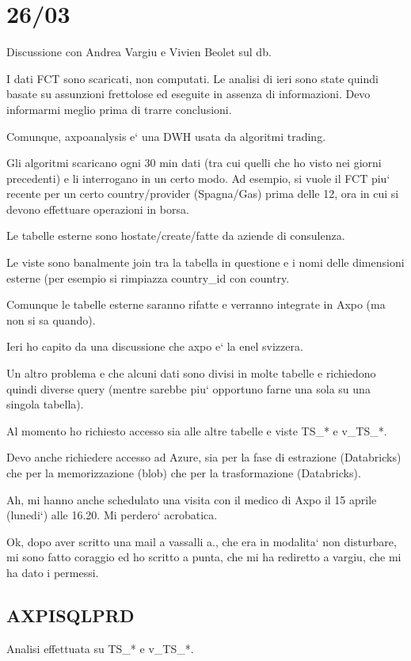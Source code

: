 \section{26/03}
    Discussione con Andrea Vargiu e Vivien Beolet sul db.
    
    I dati FCT sono scaricati, non computati. Le analisi di ieri sono state quindi basate su assunzioni frettolose ed eseguite in assenza di informazioni.
    Devo informarmi meglio prima di trarre conclusioni.
    
    Comunque, axpoanalysis e` una DWH usata da algoritmi trading.
    
    Gli algoritmi scaricano ogni 30 min dati (tra cui quelli che ho visto nei giorni precedenti) e li interrogano in un certo modo.
    Ad esempio, si vuole il FCT piu` recente per un certo country/provider (Spagna/Gas) prima delle 12, ora in cui si devono effettuare operazioni in borsa.
    
    Le tabelle esterne sono hostate/create/fatte da aziende di consulenza.
    
    Le viste sono banalmente join tra la tabella in questione e i nomi delle dimensioni esterne (per esempio si rimpiazza country\_id con country.
    
    Comunque le tabelle esterne saranno rifatte e verranno integrate in Axpo (ma non si sa quando).
    
    Ieri ho capito da una discussione che axpo e` la enel svizzera.
    
    Un altro problema e che alcuni dati sono divisi in molte tabelle e richiedono quindi diverse query (mentre sarebbe piu` opportuno farne una sola su una singola tabella).
    
    Al momento ho richiesto accesso sia alle altre tabelle e viste TS\_* e v\_TS\_*.
    
    Devo anche richiedere accesso ad Azure, sia per la fase di estrazione (Databricks) che per la memorizzazione (blob) che per la trasformazione (Databricks).
    
    Ah, mi hanno anche schedulato una visita con il medico di Axpo il 15 aprile (lunedi`) alle 16.20. Mi perdero` acrobatica.
    
    Ok, dopo aver scritto una mail a vassalli a., che era in modalita` non disturbare, mi sono fatto coraggio ed ho scritto a punta, che mi ha rediretto a vargiu, che mi ha dato i permessi.
    
    \subsection{AXPISQLPRD}
        Analisi effettuata su TS\_* e v\_TS\_*.
